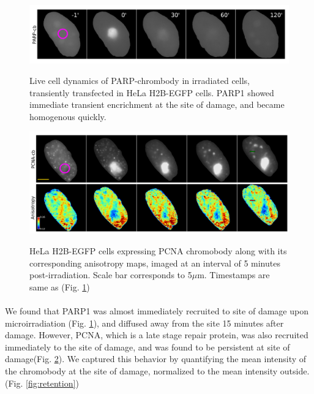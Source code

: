 \begin{figure}[H]
    {\hfill\includegraphics[clip, width=1\linewidth]{figures/parp.png}\hspace*{\fill}}
    \caption{Live cell dynamics of PARP-chrombody in irradiated cells, transiently transfected in HeLa H2B-EGFP cells. PARP1 showed immediate transient encrichment at the site of damage, and became homogenous quickly.}
    {\label{fig:parp}}
\end{figure}

\begin{figure}[H]
    {\hfill\includegraphics[clip, width=1\linewidth]{figures/pcna.png}\hspace*{\fill}}
    \caption{HeLa H2B-EGFP cells expressing PCNA chromobody along with its corresponding anisotropy maps, imaged at an  interval of 5 minutes post-irradiation. Scale bar corresponds to 5$\mu$m. Timestamps are same as (Fig. \ref{fig:parp})}
    {\label{fig:pcna}}
\end{figure}


\paragraph*{} We found that PARP1 was almost immediately recruited to site of damage upon microirradiation (Fig. \ref{fig:parp}), and diffused away from the site 15 minutes after damage. However, PCNA, which is a late stage repair protein, was also recruited immediately to the site of damage, and was found to be persistent at site of damage(Fig. \ref{fig:pcna}). We captured this behavior by quantifying the mean intensity of the chromobody at the site of damage, normalized to the mean intensity outside. (Fig. \ref{fig:retention})

